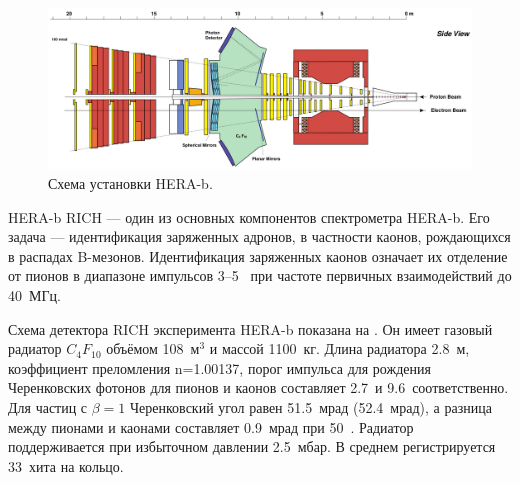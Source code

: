 

\begin{figure}[H]
\centering
\includegraphics[width=1.0\textwidth]{pictures/HERA_b_setup.png}
\caption{Схема установки HERA-b.}
\label{fig:HERAbSetup}
\end{figure}

HERA-b RICH --- один из основных компонентов спектрометра HERA-b. Его задача --- идентификация заряженных адронов, в частности каонов, рождающихся в распадах B-мезонов. Идентификация заряженных каонов означает их отделение от пионов в диапазоне импульсов 3--5~\GeVoverC{} при частоте первичных взаимодействий до 40~МГц.


Схема детектора RICH эксперимента HERA-b показана на . Он имеет газовый радиатор $C_{4}F_{10}$ объёмом 108~м$^3$ и массой 1100~кг. Длина радиатора 2.8~м, коэффициент преломления n=1.00137, порог импульса для рождения Черенковских фотонов для пионов и каонов составляет 2.7~\GeVoverC и 9.6~\GeVoverC соответственно. Для частиц с $\beta=1$ Черенковский угол равен 51.5~мрад (52.4~мрад), а разница между пионами и каонами составляет 0.9~мрад при 50~\GeVoverC{}. Радиатор поддерживается при избыточном давлении 2.5~мбар. В среднем регистрируется 33~хита на кольцо.

